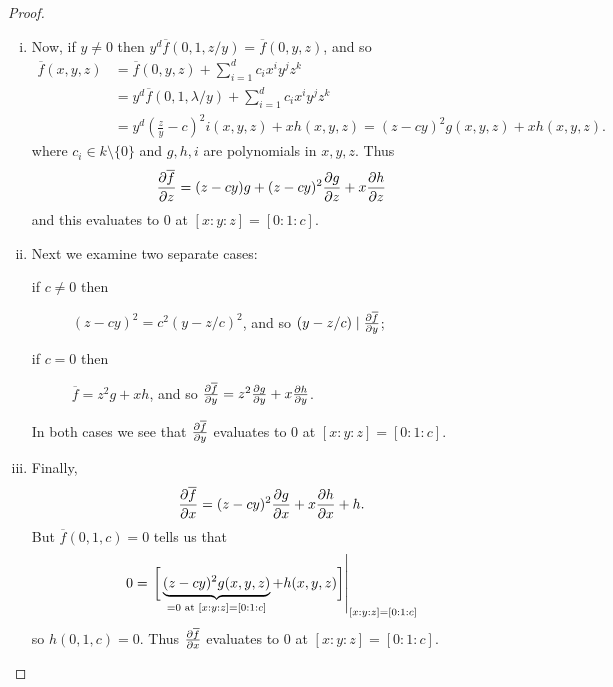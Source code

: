 \documentclass[10pt,notitlepage]{article}
\numberwithin{equation}{subsection}
\newcommand{\noz}{\setminus\{0\}}
\newcommand{\cover}[1]{\overline{#1}}
\begin{document}
\begin{proof}
                \begin{enumerate}[(i)]
                    \item Now, if $y\neq0$ then $y^d\cover{f}(0,1,z/y)=\cover{f}(0,y,z)$, and so
                        \begin{align*}
                            \cover{f}(x,y,z) &= \cover{f}(0,y,z) + \sum_{i=1}^d c_i x^i y^j z^k \\
                            & = y^d\cover{f}(0,1,\lambda/y) + \sum_{i=1}^d c_i x^i y^j z^k \\
                            &= y^d\left(\frac{z}{y}-c\right)^2i(x,y,z) + xh(x,y,z) = (z-cy)^2g(x,y,z)+xh(x,y,z).
                        \end{align*}
                        where $c_i\in k\noz$ and $g,h,i$ are polynomials in $x,y,z$.
                        Thus
                        \[
                            \pdv{\cover{f}}{z} = (z-cy)g+(z-cy)^2\pdv{g}{z} + x\pdv{h}{z}
                        \]
                        and this evaluates to $0$ at $[x:y:z]=[0:1:c]$.
                    \item Next we examine two separate cases:
                        \begin{description}
                            \item[if $c\neq0$ then] $(z-cy)^2=c^2(y-z/c)^2$, and so $(y-z/c)\mid\pdv{\cover{f}}{y}$;
                            \item[if $c=0$ then] $\cover{f}=z^2g+xh$, and so $\pdv{\cover{f}}{y}=z^2\pdv{g}{y}+x\pdv{h}{y}$.
                        \end{description}
                        In both cases we see that $\pdv{\cover{f}}{y}$ evaluates to $0$ at $[x:y:z]=[0:1:c]$.
                    \item Finally,
                        \[
                            \pdv{\cover{f}}{x} = (z-cy)^2\pdv{g}{x} + x\pdv{h}{x} + h.
                        \]
                        But $\cover{f}(0,1,c)=0$ tells us that
                        \[
                            0=\eval{\bigg[\underbrace{(z-cy)^2g(x,y,z)}_{=0\text{ at }[x:y:z]=[0:1:c]}+h(x,y,z)\bigg]}_{[x:y:z]=[0:1:c]}
                        \]
                        so $h(0,1,c)=0$.
                        Thus $\pdv{\cover{f}}{x}$ evaluates to $0$ at $[x:y:z]=[0:1:c]$.\qedhere
                \end{enumerate}
            \end{proof}

\end{document}
